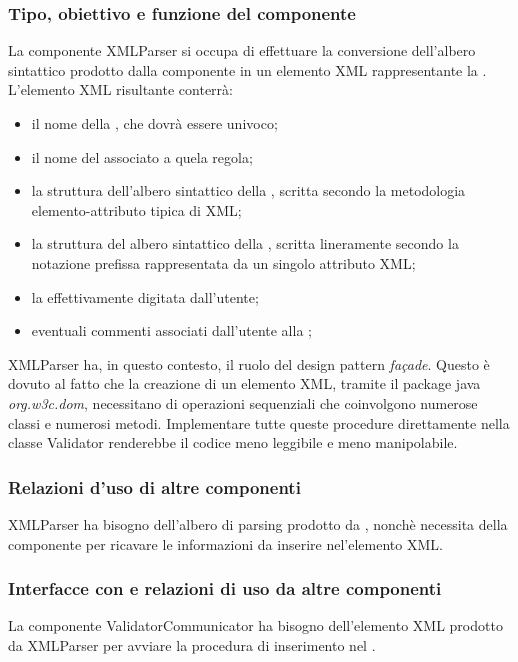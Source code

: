 \documentclass[11pt,titlepage,a4paper]{report}
\begin{document}
\subsubsection{Tipo, obiettivo e funzione del componente}
La componente XMLParser si occupa di effettuare la conversione dell'albero sintattico prodotto dalla componente \brp in un elemento XML rappresentante la \br. L'elemento XML risultante conterr\`a:
\begin{itemize}
 \item il nome della \br, che dovr\`a essere univoco;
 \item il nome del \bo associato a quela regola;
 \item la struttura dell'albero sintattico della \br, scritta secondo la metodologia elemento-attributo tipica di XML;
 \item la struttura del albero sintattico della \br, scritta lineramente secondo la notazione prefissa rappresentata da un singolo attributo XML;
 \item la \br effettivamente digitata dall'utente;
 \item eventuali commenti associati dall'utente alla \br;
\end{itemize}
XMLParser ha, in questo contesto, il ruolo del design pattern \textit{fa\c{c}ade}. Questo \`e dovuto al fatto che la creazione di un elemento XML, tramite il package java \textit{org.w3c.dom}, necessitano di operazioni sequenziali che coinvolgono numerose classi e numerosi metodi. Implementare tutte queste procedure direttamente nella classe Validator renderebbe il codice meno leggibile e meno manipolabile.
\subsubsection{Relazioni d'uso di altre componenti}
XMLParser ha bisogno dell'albero di parsing prodotto da \brp, nonch\`e necessita della componente \br per ricavare le informazioni da inserire nel'elemento XML.
\subsubsection{Interfacce con e relazioni di uso da altre componenti}
La componente ValidatorCommunicator ha bisogno dell'elemento XML prodotto da XMLParser per avviare la procedura di inserimento nel \re.
\end{document}
